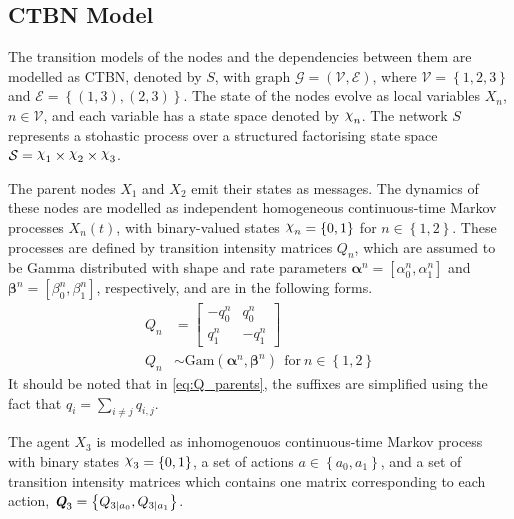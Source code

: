 \subsection{CTBN Model}
\label{sec:exp_ctbn_model}
The transition models of the nodes and the dependencies between them are modelled as CTBN, denoted by $ S $, with graph $ \mathcal{G} = \left( \mathcal{V}, \mathcal{E}\right) $, where $ \mathcal{V} = \left\lbrace 1, 2, 3 \right\rbrace $ and $ \mathcal{E} = \left\lbrace (1, 3), (2, 3)\right\rbrace  $. The state of the nodes evolve as local variables $ X_n $, $ n\in \mathcal{V} $, and each variable has a state space denoted by $ \rchi_n $. The network $ S $ represents a stohastic process over a structured factorising state space $ \mathcal{S} = \rchi_1 \times \rchi_2 \times \rchi_3 $.\par
The parent nodes $X_{1}$ and $ X_{2} $ emit their states as messages. The dynamics  of these nodes are modelled as independent homogeneous continuous-time Markov processes $X_{n}(t)$, with binary-valued states $ \rchi_{n} = \left\lbrace 0, 1 \right\rbrace  $ for $ n \in \left\lbrace 1,2 \right\rbrace $. These processes are defined by transition intensity matrices $ Q_{n} $, which are assumed to be Gamma distributed with shape and rate parameters $ \boldsymbol{\alpha}^n = [\alpha^n_0, \alpha^n_1] $ and $ \boldsymbol{\beta}^n = [\beta^n_0, \beta^n_1] $, respectively, and are in the following forms.
\begin{align}
Q_n &= 
\begin{bmatrix}
-q^n_{0} & q^n_{0} \\
q^n_{1} &  -q^n_{1}
\end{bmatrix}
\label{eq:Q_parents}\\
Q_{n} &\sim \mathrm{Gam}(\boldsymbol{\alpha}^n, \boldsymbol{\beta}^n)\ \ \text{for}\ n \in \left\lbrace 1,2\right\rbrace \label{eq:gamma_priors}
\end{align}
It should be noted that in \autoref{eq:Q_parents}, the suffixes are simplified using the fact that $ q_{i} = \sum_{i \neq j} q_{i,j}$.\par
The agent  $ X_{3} $ is modelled as inhomogenouos continuous-time Markov process with binary states $ \rchi_{3} = \left\lbrace 0, 1 \right\rbrace  $, a set of actions $ a \in \left\lbrace a_0, a_1\right\rbrace  $, and a set of transition intensity matrices which contains one matrix corresponding to each action, $ \textit{\textbf{Q}}_{3} = \left\lbrace Q_{3\mid a_{0}}, Q_{3\mid a_{1}} \right\rbrace $.\par

